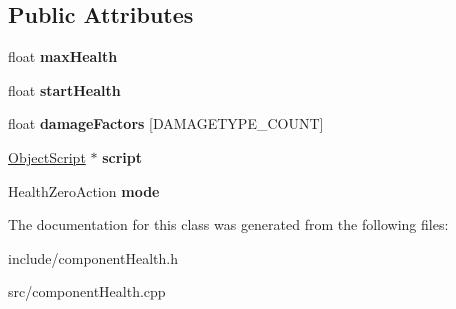 \subsection*{\-Public \-Attributes}
\begin{DoxyCompactItemize}
\item 
\hypertarget{classComponentTemplateHealth_acee702ce954a8f5c3b844bc598024d70}{
float {\bfseries max\-Health}}
\label{d1/d7d/classComponentTemplateHealth_acee702ce954a8f5c3b844bc598024d70}

\item 
\hypertarget{classComponentTemplateHealth_a14ce888db18230c65304496aae9caf7a}{
float {\bfseries start\-Health}}
\label{d1/d7d/classComponentTemplateHealth_a14ce888db18230c65304496aae9caf7a}

\item 
\hypertarget{classComponentTemplateHealth_a1eb02d89c0b4b9f79874acb894fa9dca}{
float {\bfseries damage\-Factors} \mbox{[}\-D\-A\-M\-A\-G\-E\-T\-Y\-P\-E\-\_\-\-C\-O\-U\-N\-T\mbox{]}}
\label{d1/d7d/classComponentTemplateHealth_a1eb02d89c0b4b9f79874acb894fa9dca}

\item 
\hypertarget{classComponentTemplateHealth_a7dba8744ea9eb7b906f188b7e38e91b2}{
\hyperlink{classObjectScript}{\-Object\-Script} $\ast$ {\bfseries script}}
\label{d1/d7d/classComponentTemplateHealth_a7dba8744ea9eb7b906f188b7e38e91b2}

\item 
\hypertarget{classComponentTemplateHealth_a21213194cdfacaeaa8a19d01274c73b3}{
\-Health\-Zero\-Action {\bfseries mode}}
\label{d1/d7d/classComponentTemplateHealth_a21213194cdfacaeaa8a19d01274c73b3}

\end{DoxyCompactItemize}


\-The documentation for this class was generated from the following files\-:\begin{DoxyCompactItemize}
\item 
include/component\-Health.\-h\item 
src/component\-Health.\-cpp\end{DoxyCompactItemize}
